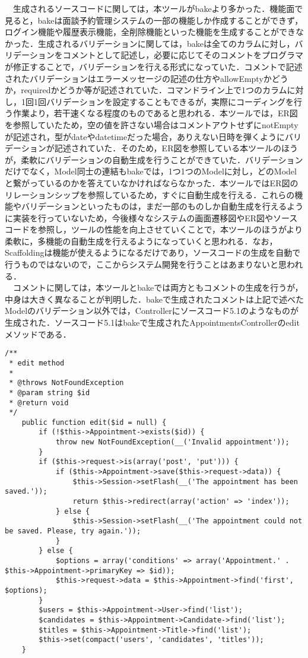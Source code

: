 \documentclass{funthesis}
\begin{document}
　生成されるソースコードに関しては，本ツールがbakeより多かった．機能面で見ると，bakeは面談予約管理システムの一部の機能しか作成することができず，ログイン機能や履歴表示機能，全削除機能といった機能を生成することができなかった．生成されるバリデーションに関しては，bakeは全てのカラムに対し，バリデーションをコメントとして記述し，必要に応じてそのコメントをプログラマが修正することで，バリデーションを行える形式になっていた．コメントで記述されたバリデーションはエラーメッセージの記述の仕方やallowEmptyかどうか，requiredかどうか等が記述されていた．コマンドライン上で1つのカラムに対し，1回1回バリデーションを設定することもできるが，実際にコーディングを行う作業より，若干速くなる程度のものであると思われる．本ツールでは，ER図を参照していたため，空の値を許さない場合はコメントアウトせずにnotEmptyが記述され，型がdateやdatetimeだった場合，ありえない日時を弾くようにバリデーションが記述されていた．そのため，ER図を参照している本ツールのほうが，柔軟にバリデーションの自動生成を行うことができていた．バリデーションだけでなく，Model同士の連結もbakeでは，1つ1つのModelに対し，どのModelと繋がっているのかを答えていなかければならなかった．本ツールではER図のリレーションシップを参照しているため，すぐに自動生成を行える．これらの機能やバリデーションといったものは，まだ一部のものしか自動生成を行えるように実装を行っていないため，今後様々なシステムの画面遷移図やER図やソースコードを参照し，ツールの性能を向上させていくことで，本ツールのほうがより柔軟に，多機能の自動生成を行えるようになっていくと思われる．なお，Scaffoldingは機能が使えるようになるだけであり，ソースコードの生成を自動で行うものではないので，ここからシステム開発を行うことはあまりないと思われる．\\
　コメントに関しては，本ツールとbakeでは両方ともコメントの生成を行うが，中身は大きく異なることが判明した．bakeで生成されたコメントは上記で述べたModelのバリデーション以外では，Controllerにソースコード5.1のようなものが生成された．ソースコード5.1はbakeで生成されたAppointmentsControllerのeditメソッドである．\\
\begin{lstlisting}[caption=AppointmentsController.phpの一部,label=1]
/**
 * edit method
 *
 * @throws NotFoundException
 * @param string $id
 * @return void
 */
	public function edit($id = null) {
		if (!$this->Appointment->exists($id)) {
			throw new NotFoundException(__('Invalid appointment'));
		}
		if ($this->request->is(array('post', 'put'))) {
			if ($this->Appointment->save($this->request->data)) {
				$this->Session->setFlash(__('The appointment has been saved.'));
				return $this->redirect(array('action' => 'index'));
			} else {
				$this->Session->setFlash(__('The appointment could not be saved. Please, try again.'));
			}
		} else {
			$options = array('conditions' => array('Appointment.' . $this->Appointment->primaryKey => $id));
			$this->request->data = $this->Appointment->find('first', $options);
		}
		$users = $this->Appointment->User->find('list');
		$candidates = $this->Appointment->Candidate->find('list');
		$titles = $this->Appointment->Title->find('list');
		$this->set(compact('users', 'candidates', 'titles'));
	}
\end{lstlisting}
\end{document}
